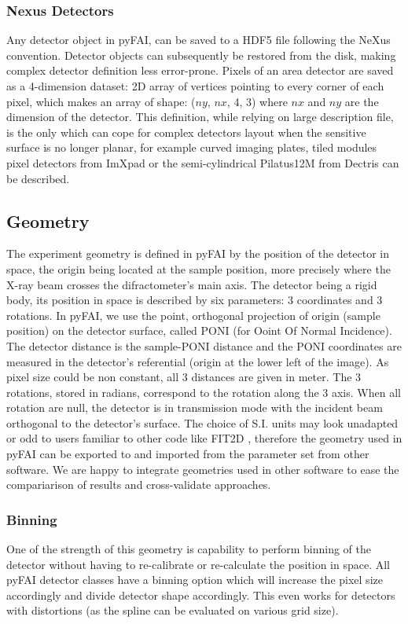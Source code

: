 \documentclass[preprint]{iucr}
\begin{document}
\subsubsection{Nexus Detectors}
Any detector object in pyFAI, can be saved to a HDF5 file following the NeXus
\cite{nexus} convention.
Detector objects can subsequently be restored from the disk, making
complex detector definition less error-prone.
Pixels of an area detector are saved as a 4-dimension dataset: 2D
array of vertices pointing to every corner of each pixel, which makes an array
of shape: ($ny$, $nx$, 4, 3) where $nx$ and $ny$ are the dimension of the
detector.
This definition, while relying on large description file, is the only which
can cope for complex detectors layout when the sensitive surface is no
longer planar, for example curved imaging plates, tiled modules pixel detectors
from ImXpad or the semi-cylindrical Pilatus12M from Dectris can be described.

\subsection{Geometry}
The experiment geometry is defined in pyFAI by the position of the detector in
space, the origin being located at the sample position, more precisely where the
X-ray beam crosses the difractometer's main axis.
The detector being a rigid body, its position in space is described by six
parameters: 3 coordinates and 3 rotations. 
In pyFAI, we use the point, orthogonal projection
of origin (sample position) on the detector surface, called PONI (for Ooint Of
Normal Incidence). The detector distance is the sample-PONI distance and the PONI
coordinates are measured in the detector's referential (origin at the lower
left of the image). As pixel size could be non constant, all 3 distances are
given in meter.
The 3 rotations, stored in radians, correspond to the rotation along the 3 axis.
When all rotation are null, the detector is in transmission mode with the
incident beam orthogonal to the detector's surface.
The choice of S.I. units may look unadapted or odd to users familiar to
other code like FIT2D \cite{fit2d}, therefore the geometry used in pyFAI can be
exported to and imported from the parameter set from other software.
We are happy to integrate geometries used in other software to ease the
compariarison of results and cross-validate approaches.  
 
\subsubsection{Binning}
One of the strength of this geometry is capability to perform binning of the
detector without having to re-calibrate or re-calculate the position in space.
All pyFAI detector classes have a binning option which will increase the pixel
size accordingly and divide detector shape accordingly. 
This even works for detectors with distortions (as the spline can be
evaluated on various grid size).
\end{document}

